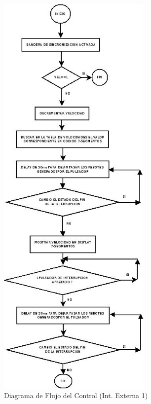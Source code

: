 \documentclass[a4paper,10pt]{article}
\begin{document}
					\newpage
					\begin{figure}[!htb]
						\centering
						\includegraphics[width=7.5cm]{Imagenes/DiagFlujoControl2.jpg}
						\caption{Diagrama de Flujo del Control (Int. Externa 1)} \label{ControlFlujo3}
					\end{figure}
\end{document}
